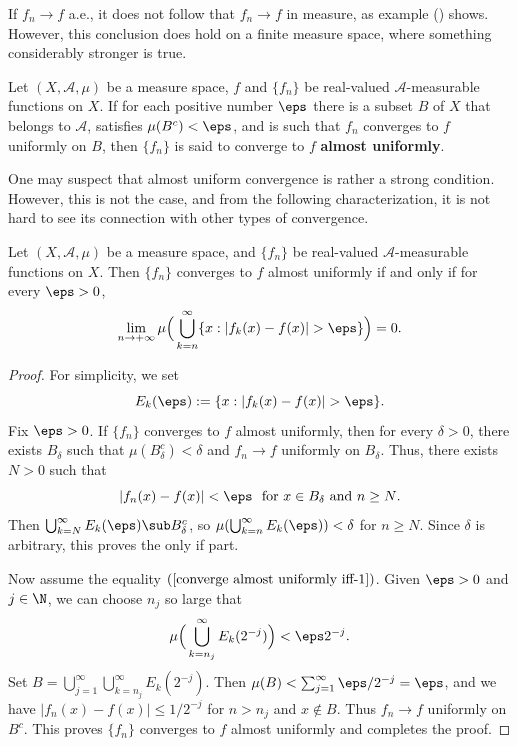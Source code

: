 If $f_n\to f$ a.e., it does not follow that $f_n\to f$ in measure, as example () shows. However, this conclusion does hold on a finite measure space, where something considerably stronger is true.
\begin{definition}
Let $(X,\mathcal{A},\mu)$ be a measure space, $f$ and $\{f_n\}$ be real-valued $\mathcal{A}$-measurable functions on $X$. If for each positive number $\eps$ there is a subset $B$ of $X$ that belongs to $\mathcal{A}$, satisfies $\mu(B^c)<\eps$, and is such that $f_n$ converges to $f$ uniformly on $B$, then $\{f_n\}$ is said to converge to $f$ \textbf{almost uniformly}.
\end{definition}
One may suspect that almost uniform convergence is rather a strong condition. However, this is not the case, and from the following characterization, it is not hard to see its connection with other types of convergence.
\begin{lemma}\label{converge almost uniformly iff}
Let $(X,\mathcal{A},\mu)$ be a measure space, and $\{f_n\}$ be real-valued $\mathcal{A}$-measurable functions on $X$. Then $\{f_n\}$ converges to $f$ almost uniformly if and only if for every $\eps>0$,
\begin{align}\label{converge almost uniformly iff-1}
\lim_{n\to+\infty}\mu\Big(\bigcup_{k=n}^{\infty}\{x:|f_k(x)-f(x)|>\eps\}\Big)=0.
\end{align}
\end{lemma}
\begin{proof}
For simplicity, we set
\[E_k(\eps):=\{x:|f_k(x)-f(x)|>\eps\}.\]
Fix $\eps>0$. If $\{f_n\}$ converges to $f$ almost uniformly, then for every $\delta>0$, there exists $B_\delta$ such that $\mu(B_\delta^c)<\delta$ and $f_n\to f$ uniformly on $B_\delta$. Thus, there exists $N>0$ such that
\[|f_n(x)-f(x)|<\eps\ \text{ for $x\in B_\delta$ and $n\geq N$}.\]
Then $\bigcup_{k=N}^{\infty}E_k(\eps)\sub B_\delta^c$, so $\mu(\bigcup_{k=n}^{\infty}E_k(\eps))<\delta$ for $n\geq N$. Since $\delta$ is arbitrary, this proves the only if part.\par
Now assume the equality $(\ref{converge almost uniformly iff-1})$. Given $\eps>0$ and $j\in\N$, we can choose $n_j$ so large that 
\[\mu\Big(\bigcup_{k=n_j}^{\infty}E_k(2^{-j})\Big)<\eps 2^{-j}.\]
Set $B=\bigcup_{j=1}^{\infty}\bigcup_{k=n_j}^{\infty}E_k(2^{-j})$. Then $\mu(B)<\sum_{j=1}^{\infty}\eps/2^{-j}=\eps$, and we have $|f_n(x)-f(x)|\leq 1/2^{-j}$ for $n>n_j$ and $x\notin B$. Thus $f_n\to f$ uniformly on $B^c$. This proves $\{f_n\}$ converges to $f$ almost uniformly and completes the proof.
\end{proof}
